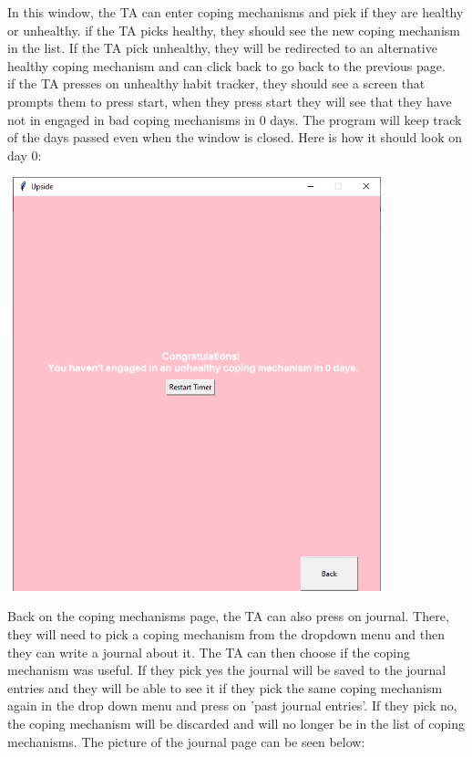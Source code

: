 \documentclass{article}
\begin{document}
    In this window, the TA can enter coping mechanisms and pick if they are healthy or unhealthy. if the TA picks healthy, they should see the new coping mechanism in the list. If the TA pick unhealthy, they will be redirected to an alternative healthy coping mechanism and can click back to go back to the previous page. \\

    if the TA presses on unhealthy habit tracker, they should see a screen that prompts them to press start, when they press start they will see that they have not in engaged in bad coping mechanisms in 0 days. The program will keep track of the days passed even when the window is closed. Here is how it should look on day 0: \\

    \begin{center}
        \includegraphics[width=11cm,height=12cm]{Images/timer.png}
    \end{center}

    Back on the coping mechanisms page, the TA can also press on journal. There, they will need to pick a coping mechanism from the dropdown menu and then they can write a journal about it. The TA can then choose if the coping mechanism was useful. If they pick yes the journal will be saved to the journal entries and they will be able to see it if they pick the same coping mechanism again in the drop down menu and press on 'past journal entries'. If they pick no, the coping mechanism will be discarded and will no longer be in the list of coping mechanisms. The picture of the journal page can be seen below: \\
\end{document}
